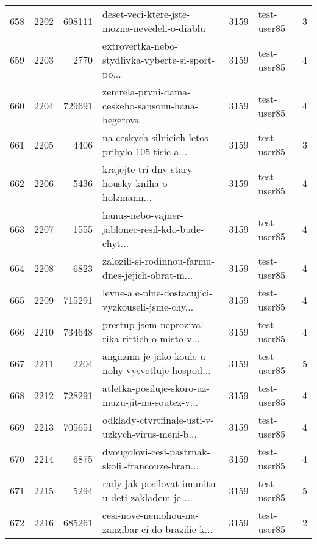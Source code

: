 \begin{tabular}{lrrlrlr}
658  &       2202 &   698111 &      deset-veci-ktere-jste-mozna-nevedeli-o-diablu &     3159 &                  test-user85 &               3 \\
659  &       2203 &     2770 &  extrovertka-nebo-stydlivka-vyberte-si-sport-po... &     3159 &                  test-user85 &               4 \\
660  &       2204 &   729691 &   zemrela-prvni-dama-ceskeho-sansonu-hana-hegerova &     3159 &                  test-user85 &               4 \\
661  &       2205 &     4406 &  na-ceskych-silnicich-letos-pribylo-105-tisic-a... &     3159 &                  test-user85 &               3 \\
662  &       2206 &     5436 &  krajejte-tri-dny-stary-housky-kniha-o-holzmann... &     3159 &                  test-user85 &               4 \\
663  &       2207 &     1555 &  hanus-nebo-vajner-jablonec-resil-kdo-bude-chyt... &     3159 &                  test-user85 &               4 \\
664  &       2208 &     6823 &  zalozili-si-rodinnou-farmu-dnes-jejich-obrat-m... &     3159 &                  test-user85 &               4 \\
665  &       2209 &   715291 &  levne-ale-plne-dostacujici-vyzkouseli-jsme-chy... &     3159 &                  test-user85 &               4 \\
666  &       2210 &   734648 &  prestup-jsem-neprozival-rika-rittich-o-misto-v... &     3159 &                  test-user85 &               4 \\
667  &       2211 &     2204 &  angazma-je-jako-koule-u-nohy-vysvetluje-hospod... &     3159 &                  test-user85 &               5 \\
668  &       2212 &   728291 &  atletka-posiluje-skoro-uz-muzu-jit-na-soutez-v... &     3159 &                  test-user85 &               4 \\
669  &       2213 &   705651 &  odklady-ctvrtfinale-usti-v-uzkych-virus-meni-b... &     3159 &                  test-user85 &               4 \\
670  &       2214 &     6875 &  dvougolovi-cesi-pastrnak-skolil-francouze-bran... &     3159 &                  test-user85 &               4 \\
671  &       2215 &     5294 &  rady-jak-posilovat-imunitu-u-deti-zakladem-je-... &     3159 &                  test-user85 &               5 \\
672  &       2216 &   685261 &  cesi-nove-nemohou-na-zanzibar-ci-do-brazilie-k... &     3159 &                  test-user85 &               2 \\

\end{tabular}

